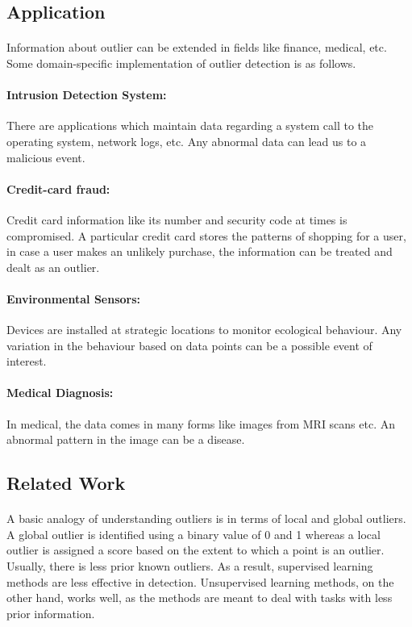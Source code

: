 \documentclass[runningheads]{llncs}
\begin{document}
\subsection{Application}
\paragraph{} Information about outlier can be extended in fields like finance, medical, etc. Some domain-specific implementation of outlier detection is as follows.

\paragraph{Intrusion Detection System: }There are applications which maintain data regarding a system call to the operating system, network logs, etc. Any abnormal data can lead us to a malicious event.
\paragraph{Credit-card fraud:} Credit card information like its number and security code at times is compromised. A particular credit card stores the patterns of shopping for a user, in case a user makes an unlikely purchase, the information can be treated and dealt as an outlier.
\paragraph{Environmental Sensors:} Devices are installed at strategic locations to monitor ecological behaviour. Any variation in the behaviour based on data points can be a possible event of interest.
\paragraph{Medical Diagnosis:} In medical, the data comes in many forms like images from MRI scans etc. An abnormal pattern in the image can be a disease.

\subsection{Related Work}

\paragraph{} A basic analogy of understanding outliers is in terms of local and global outliers. A global outlier is identified using a binary value of 0 and 1 whereas a local outlier is assigned a score based on the extent to which a point is an outlier. Usually, there is less prior known outliers. As a result, supervised learning methods are less effective in detection. Unsupervised learning methods, on the other hand, works well, as the methods are meant to deal with tasks with less prior information.
\end{document}
